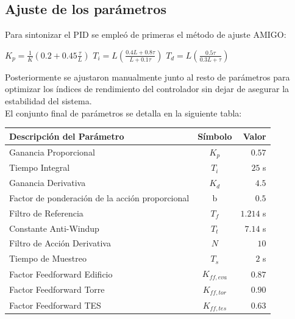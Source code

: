 	 \subsection{Ajuste de los parámetros}
	 
	Para sintonizar el PID se empleó de primeras el método de ajuste AMIGO:
	\begin{center}
		\small
		$K_p = \frac{1}{K} ( 0.2 + 0.45 \frac{\tau}{L} )$ \quad $T_i = L ( \frac{0.4L + 0.8\tau}{L + 0.1\tau} )$ \quad $T_d = L ( \frac{0.5\tau}{0.3L + \tau} ) $
	\end{center}
	Posteriormente se ajustaron manualmente junto al resto de parámetros para optimizar los índices de rendimiento del controlador sin dejar de asegurar la estabilidad del sistema.\\
	
	 El conjunto final de parámetros se detalla en la siguiente tabla:
	 
	 \begin{center}
	 	\small
	 	\begin{tabular}{|l|c|r|}
	 		\hline
	 		\textbf{Descripción del Parámetro} & \textbf{Símbolo} & \textbf{Valor} \\
	 		\hline
	 		Ganancia Proporcional & $K_p$ & $0.57$ \\
	 		\hline
	 		Tiempo Integral & $T_i$ & $25$ s \\
	 		\hline
	 		Ganancia Derivativa & $K_d$ & $4.5$ \\
	 		\hline
	 		Factor de ponderación de la acción proporcional & b & $0.5$ \\
	 		\hline
	 		Filtro de Referencia & $T_f$ & $1.214$ s \\
	 		\hline
	 		Constante Anti-Windup & $T_t$ & $7.14$ s \\
	 		\hline
	 		Filtro de Acción Derivativa & $N$ & $10$ \\
	 		\hline
	 		Tiempo de Muestreo & $T_s$ & $2$ s \\
	 		\hline
	 		Factor Feedforward Edificio & $K_{ff,eva}$ & $0.87$ \\
	 		\hline
	 		Factor Feedforward Torre & $K_{ff,tor}$ & $0.90$ \\
	 		\hline
	 		Factor Feedforward TES & $K_{ff,tes}$ & $0.63$ \\
	 		\hline
	 	\end{tabular}
	 \end{center}